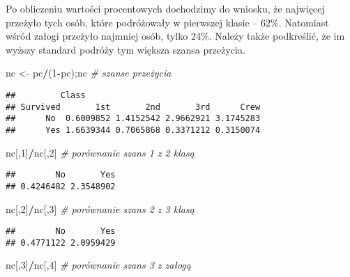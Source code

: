 \documentclass[polish,]{book}
\newenvironment{Shaded}{\begin{snugshade}}{\end{snugshade}}
\newcommand{\CommentTok}[1]{\textcolor[rgb]{0.56,0.35,0.01}{\textit{#1}}}
\newcommand{\DecValTok}[1]{\textcolor[rgb]{0.00,0.00,0.81}{#1}}
\newcommand{\NormalTok}[1]{#1}
\newcommand{\OperatorTok}[1]{\textcolor[rgb]{0.81,0.36,0.00}{\textbf{#1}}}
\newcommand{\StringTok}[1]{\textcolor[rgb]{0.31,0.60,0.02}{#1}}
\begin{document}
Po obliczeniu wartości procentowych dochodzimy do wniosku, że najwięcej przeżyło
tych osób, które podróżowały w pierwszej klasie -- \(62\%\). Natomiast wśród załogi
przeżyło najmniej osób, tylko \(24\%\). Należy także podkreślić, że im wyższy standard podróży tym większa szansa przeżycia.

\begin{Shaded}
\begin{Highlighting}[]
\NormalTok{nc <-}\StringTok{ }\NormalTok{pc}\OperatorTok{/}\NormalTok{(}\DecValTok{1}\OperatorTok{-}\NormalTok{pc);nc }\CommentTok{# szanse przeżycia}
\end{Highlighting}
\end{Shaded}

\begin{verbatim}
##         Class
## Survived       1st       2nd       3rd      Crew
##      No  0.6009852 1.4152542 2.9662921 3.1745283
##      Yes 1.6639344 0.7065868 0.3371212 0.3150074
\end{verbatim}

\begin{Shaded}
\begin{Highlighting}[]
\NormalTok{nc[,}\DecValTok{1}\NormalTok{]}\OperatorTok{/}\NormalTok{nc[,}\DecValTok{2}\NormalTok{]      }\CommentTok{# porównanie szans 1 z 2 klasą}
\end{Highlighting}
\end{Shaded}

\begin{verbatim}
##        No       Yes 
## 0.4246482 2.3548902
\end{verbatim}

\begin{Shaded}
\begin{Highlighting}[]
\NormalTok{nc[,}\DecValTok{2}\NormalTok{]}\OperatorTok{/}\NormalTok{nc[,}\DecValTok{3}\NormalTok{]      }\CommentTok{# porównanie szans 2 z 3 klasą}
\end{Highlighting}
\end{Shaded}

\begin{verbatim}
##        No       Yes 
## 0.4771122 2.0959429
\end{verbatim}

\begin{Shaded}
\begin{Highlighting}[]
\NormalTok{nc[,}\DecValTok{3}\NormalTok{]}\OperatorTok{/}\NormalTok{nc[,}\DecValTok{4}\NormalTok{]      }\CommentTok{# porównanie szans 3 z załogą}
\end{Highlighting}
\end{Shaded}
\end{document}

